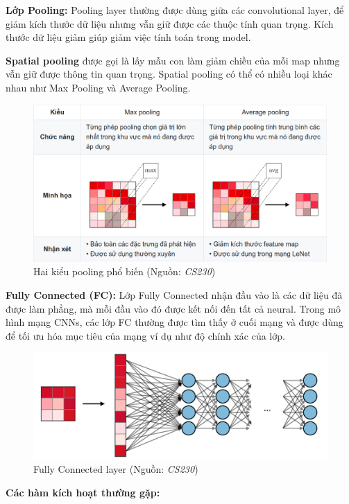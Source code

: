 \documentclass[a4paper, 12pt]{report}
\begin{document}
\textbf{Lớp Pooling:} Pooling layer thường được dùng giữa các convolutional layer, để giảm kích thước dữ liệu nhưng vẫn giữ được các thuộc tính quan trọng. Kích thước dữ liệu giảm giúp giảm việc tính toán trong model.\par
\textbf{Spatial pooling} được gọi là lấy mẫu con làm giảm chiều của mỗi map nhưng vẫn giữ được thông tin quan trọng. Spatial pooling có thể có nhiều loại khác nhau như Max Pooling và Average Pooling. \par
\begin{figure}[!h]
	\centering
	\includegraphics[width=0.9\linewidth]{Images/pooling}
	\caption{Hai kiểu pooling phổ biến (Nguồn: \textit{CS230})}
	\label{fig:pooling}
\end{figure}
\textbf{Fully Connected (FC):} Lớp Fully Connected nhận đầu vào là các dữ liệu đã được làm phẳng, mà mỗi đầu vào đó được kết nối đến tất cả neural. Trong mô hình mạng CNNs, các lớp FC thường được tìm thấy ở cuối mạng và được dùng để tối ưu hóa mục tiêu của mạng ví dụ như độ chính xác của lớp. \par
\begin{figure}[!h]
	\centering
	\includegraphics[width=0.9\linewidth]{Images/fc}
	\caption{Fully Connected layer (Nguồn: \textit{CS230})}
	\label{fig:fc}
\end{figure}
\textbf{Các hàm kích hoạt thường gặp:} 
\end{document}
